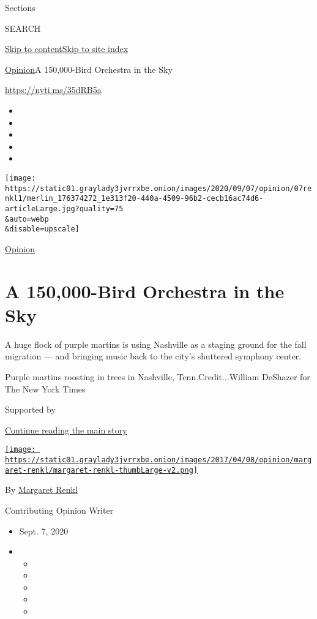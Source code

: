 Sections

SEARCH

\protect\hyperlink{site-content}{Skip to
content}\protect\hyperlink{site-index}{Skip to site index}

\href{/section/opinion}{Opinion}\textbar{}A 150,000-Bird Orchestra in
the Sky

\url{https://nyti.ms/35dRB5a}

\begin{itemize}
\item
\item
\item
\item
\item
\end{itemize}

\texttt{[image: https://static01.graylady3jvrrxbe.onion/images/2020/09/07/opinion/07renkl1/merlin\_176374272\_1e313f20-440a-4509-96b2-cecb16ac74d6-articleLarge.jpg?quality=75\\\&auto=webp\\\&disable=upscale]}

\href{/section/opinion}{Opinion}

\hypertarget{a-150000-bird-orchestra-in-the-sky}{%
\section{A 150,000-Bird Orchestra in the
Sky}\label{a-150000-bird-orchestra-in-the-sky}}

A huge flock of purple martins is using Nashville as a staging ground
for the fall migration --- and bringing music back to the city's
shuttered symphony center.

Purple martins roosting in trees in Nashville, Tenn.Credit...William
DeShazer for The New York Times

Supported by

\protect\hyperlink{after-sponsor}{Continue reading the main story}

\href{https://www.nytimes3xbfgragh.onion/by/margaret-renkl}{\texttt{[image: https://static01.graylady3jvrrxbe.onion/images/2017/04/08/opinion/margaret-renkl/margaret-renkl-thumbLarge-v2.png]}}

By \href{https://www.nytimes3xbfgragh.onion/by/margaret-renkl}{Margaret
Renkl}

Contributing Opinion Writer

\begin{itemize}
\item
  Sept. 7, 2020
\item
  \begin{itemize}
  \item
  \item
  \item
  \item
  \item
  \end{itemize}
\end{itemize}

